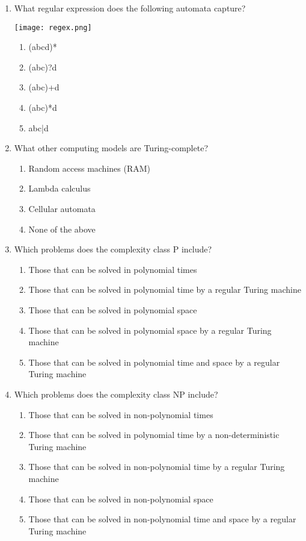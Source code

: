 \documentclass[11pt]{article}
\begin{document}
\begin{enumerate}
\item What regular expression does the following automata capture?
\begin{center}
\texttt{[image: regex.png]}
\end{center}
\begin{enumerate}
\item (abcd)*
\item (abc)?d
\item (abc)+d
\item (abc)*d
\item abc|d
\end{enumerate}

\item What other computing models are Turing-complete?
\begin{enumerate}
\item Random access machines (RAM)
\item Lambda calculus
\item Cellular automata
\item None of the above
\end{enumerate}

\item Which problems does the complexity class P include?
\begin{enumerate}
\item Those that can be solved in polynomial times
\item Those that can be solved in polynomial time by a regular Turing machine
\item Those that can be solved in polynomial space
\item Those that can be solved in polynomial space by a regular Turing machine
\item Those that can be solved in polynomial time and space by a regular Turing machine
\end{enumerate}

\item Which problems does the complexity class NP include?
\begin{enumerate}
\item Those that can be solved in non-polynomial times
\item Those that can be solved in polynomial time by a non-deterministic Turing machine
\item Those that can be solved in non-polynomial time by a regular Turing machine
\item Those that can be solved in non-polynomial space
\item Those that can be solved in non-polynomial time and space by a regular Turing machine
\end{enumerate}


\end{enumerate}
\end{document}
